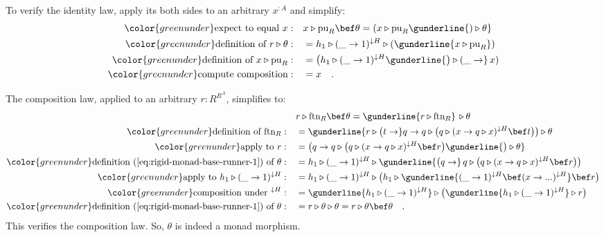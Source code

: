 To verify the identity law, apply its both sides to an arbitrary $x^{:A}$
and simplify:
\begin{align*}
{\color{greenunder}\text{expect to equal }x:}\quad & x\triangleright\text{pu}_{R}\bef\theta=(x\triangleright\text{pu}_{R}\gunderline{)\triangleright\theta}\\
{\color{greenunder}\text{definition of }r\triangleright\theta:}\quad & =h_{1}\triangleright(\_\rightarrow1)^{\downarrow H}\triangleright(\gunderline{x\triangleright\text{pu}_{R}})\\
{\color{greenunder}\text{definition of }x\triangleright\text{pu}_{R}:}\quad & =\big(h_{1}\triangleright(\_\rightarrow1)^{\downarrow H}\gunderline{\big)\triangleright(\_\rightarrow}\,x)\\
{\color{greenunder}\text{compute composition}:}\quad & =x\quad.
\end{align*}

The composition law, applied to an arbitrary $r:R^{R^{A}}$, simplifies
to:
\begin{align*}
 & r\triangleright\text{ftn}_{R}\bef\theta=\gunderline{r\triangleright\text{ftn}_{R}}\,\triangleright\theta\\
{\color{greenunder}\text{definition of }\text{ftn}_{R}:}\quad & =\gunderline{r\triangleright\big(t\rightarrow}q\rightarrow q\triangleright\big(q\triangleright(x\rightarrow q\triangleright x)^{\downarrow H}\bef t\big)\big)\triangleright\theta\\
{\color{greenunder}\text{apply to }r:}\quad & =\big(q\rightarrow q\triangleright\big(q\triangleright(x\rightarrow q\triangleright x)^{\downarrow H}\bef r\big)\gunderline{\big)\triangleright\theta}\\
{\color{greenunder}\text{definition~(\ref{eq:rigid-monad-base-runner-1}) of }\theta:}\quad & =h_{1}\triangleright(\_\rightarrow1)^{\downarrow H}\triangleright\gunderline{\big(q\rightarrow}\,q\triangleright\big(q\triangleright(x\rightarrow q\triangleright x)^{\downarrow H}\bef r\big)\big)\\
{\color{greenunder}\text{apply to }h_{1}\triangleright(\_\rightarrow1)^{\downarrow H}:}\quad & =h_{1}\triangleright(\_\rightarrow1)^{\downarrow H}\triangleright\big(h_{1}\triangleright\gunderline{(\_\rightarrow1)^{\downarrow H}\bef(x\rightarrow...)^{\downarrow H}}\bef r\big)\\
{\color{greenunder}\text{composition under }^{\downarrow H}:}\quad & =\gunderline{h_{1}\triangleright(\_\rightarrow1)^{\downarrow H}}\triangleright\big(\gunderline{h_{1}\triangleright(\_\rightarrow1)^{\downarrow H}}\triangleright r\big)\\
{\color{greenunder}\text{definition~(\ref{eq:rigid-monad-base-runner-1}) of }\theta:}\quad & =r\triangleright\theta\triangleright\theta=r\triangleright\theta\bef\theta\quad.
\end{align*}
This verifies the composition law. So, $\theta$ is indeed a monad
morphism.

